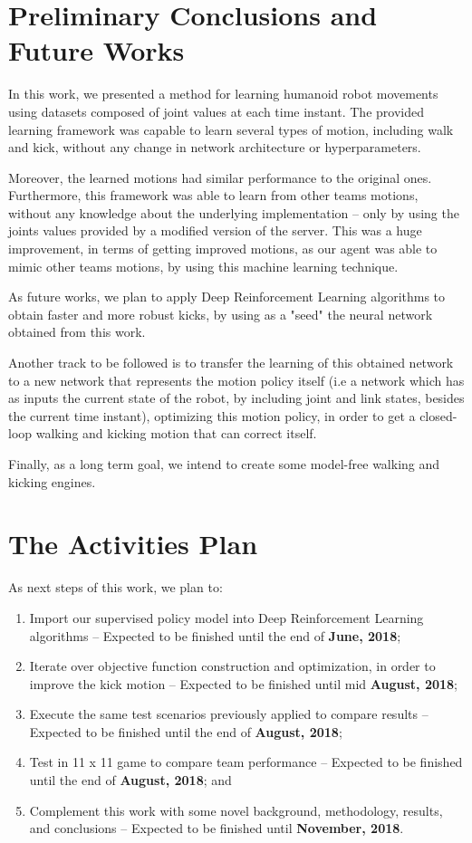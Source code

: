 \section {Preliminary Conclusions and Future Works}

In this work, we presented a method for learning humanoid robot movements using datasets composed of joint values at each time instant. The provided learning framework was capable to learn several types of motion, including walk and kick, without any change in network architecture or hyperparameters.

Moreover, the learned motions had similar performance to the original ones. Furthermore, this framework was able to learn from other teams motions, without any knowledge about the underlying implementation -- only by using the joints values provided by a modified version of the server. This was a huge improvement, in terms of getting improved motions, as our agent was able to mimic other teams motions, by using this machine learning technique.

As future works, we plan to apply Deep Reinforcement Learning algorithms to obtain faster and more robust kicks, by using as a "seed" the neural network obtained from this work.

Another track to be followed is to transfer the learning of this obtained network to a new network that represents the motion policy itself (i.e a network which has as inputs the current state of the robot, by including joint and link states, besides the current time instant), optimizing this motion policy, in order to get a closed-loop walking and kicking motion that can correct itself.

Finally, as a long term goal, we intend to create some model-free walking and kicking engines.

\section{The Activities Plan}

As next steps of this work, we plan to:

\begin{enumerate}
\item Import our supervised policy model into Deep Reinforcement Learning algorithms -- Expected to be finished until the end of \textbf{June, 2018};
\item Iterate over objective function construction and optimization, in order to improve the kick motion -- Expected to be finished until mid \textbf{August, 2018};
\item Execute the same test scenarios previously applied to compare results -- Expected to be finished until the end of \textbf{August, 2018}; 
\item Test in 11 x 11 game to compare team performance -- Expected to be finished until the end of \textbf{August, 2018}; and
\item Complement this work with some novel background, methodology, results, and conclusions -- Expected to be finished until \textbf{November, 2018}.
\end{enumerate}
